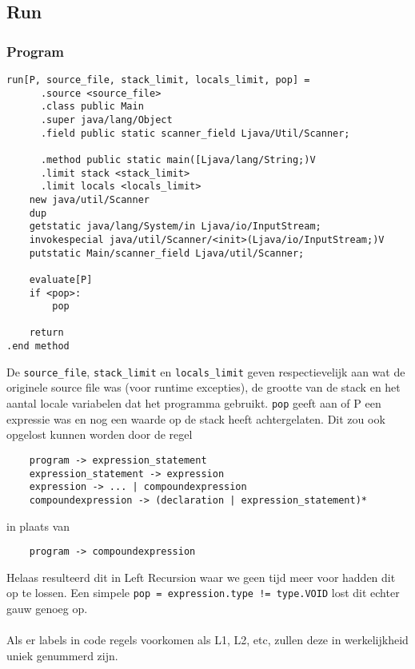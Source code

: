 \documentclass[]{article}
\begin{document}
\subsection{Run}
\subsubsection{Program}

\begin{verbatim}
run[P, source_file, stack_limit, locals_limit, pop] = 
	  .source <source_file>
	  .class public Main
	  .super java/lang/Object
	  .field public static scanner_field Ljava/Util/Scanner;
	  
	  .method public static main([Ljava/lang/String;)V
	  .limit stack <stack_limit>
	  .limit locals <locals_limit>
    new java/util/Scanner
    dup
    getstatic java/lang/System/in Ljava/io/InputStream;
    invokespecial java/util/Scanner/<init>(Ljava/io/InputStream;)V
    putstatic Main/scanner_field Ljava/util/Scanner;

    evaluate[P]
    if <pop>:
        pop

    return
.end method
\end{verbatim}

De \texttt{source\_file}, \texttt{stack\_limit} en \texttt{locals\_limit} geven respectievelijk aan wat de originele source file was (voor runtime excepties), de grootte van de stack en het aantal locale variabelen dat het programma gebruikt. \texttt{pop} geeft aan of P een expressie was en nog een waarde op de stack heeft achtergelaten. Dit zou ook opgelost kunnen worden door de regel

\begin{verbatim}
    program -> expression_statement
    expression_statement -> expression
    expression -> ... | compoundexpression
    compoundexpression -> (declaration | expression_statement)* 
\end{verbatim}

in plaats van

\begin{verbatim}
    program -> compoundexpression
\end{verbatim}

Helaas resulteerd dit in Left Recursion waar we geen tijd meer voor hadden dit op te lossen. Een simpele \texttt{pop = expression.type != type.VOID} lost dit echter gauw genoeg op.\\
\\
Als er labels in code regels voorkomen als L1, L2, etc, zullen deze in werkelijkheid uniek genummerd zijn.
\end{document}
